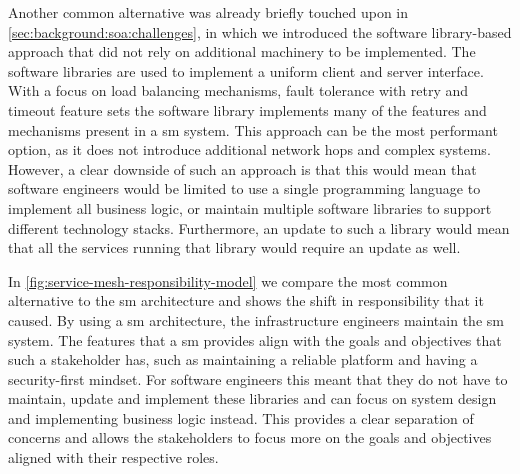 Another common alternative was already briefly touched upon in  \cref{sec:background:soa:challenges}, in which we introduced the software library-based approach that did not rely on additional machinery to be implemented. The software libraries are used to implement a uniform client and server interface. With a focus on load balancing mechanisms, fault tolerance with retry and timeout feature sets the software library implements many of the features and mechanisms present in a \gls{sm} system. This approach can be the most performant option, as it does not introduce additional network hops and complex systems. However, a clear downside of such an approach is that this would mean that software engineers would be limited to use a single programming language to implement all business logic, or maintain multiple software libraries to support different technology stacks. Furthermore, an update to such a library would mean that all the services running that library would require an update as well. 

In \cref{fig:service-mesh-responsibility-model} we compare the most common alternative to the \gls{sm} architecture and shows the shift in responsibility that it caused. By using a \gls{sm} architecture, the infrastructure engineers maintain the \gls{sm} system. The features that a \gls{sm} provides align with the goals and objectives that such a stakeholder has, such as maintaining a reliable platform and having a security-first mindset. For software engineers this meant that they do not have to maintain, update and implement these libraries and can focus on system design and implementing business logic instead. This provides a clear separation of concerns and allows the stakeholders to focus more on the goals and objectives aligned with their respective roles.